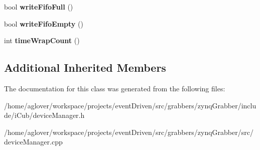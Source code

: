 \begin{DoxyCompactItemize}
\item 
\hypertarget{classaerDevManager_a43bf479627c366e50909fb3b1d7de785}{bool {\bfseries write\-Fifo\-Full} ()}\label{classaerDevManager_a43bf479627c366e50909fb3b1d7de785}

\item 
\hypertarget{classaerDevManager_a9dcf809a01b3a3ab93f9a0a73113a8a0}{bool {\bfseries write\-Fifo\-Empty} ()}\label{classaerDevManager_a9dcf809a01b3a3ab93f9a0a73113a8a0}

\item 
\hypertarget{classaerDevManager_a3e3361083ce17907c2c190fac753c2ef}{int {\bfseries time\-Wrap\-Count} ()}\label{classaerDevManager_a3e3361083ce17907c2c190fac753c2ef}

\end{DoxyCompactItemize}
\subsection*{Additional Inherited Members}


The documentation for this class was generated from the following files\-:\begin{DoxyCompactItemize}
\item 
/home/aglover/workspace/projects/event\-Driven/src/grabbers/zynq\-Grabber/include/i\-Cub/device\-Manager.\-h\item 
/home/aglover/workspace/projects/event\-Driven/src/grabbers/zynq\-Grabber/src/device\-Manager.\-cpp\end{DoxyCompactItemize}
